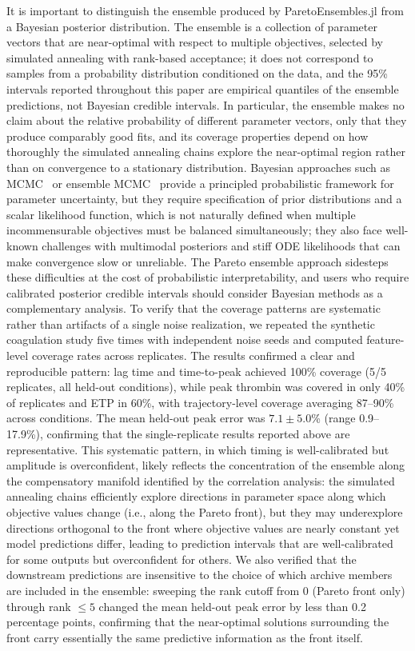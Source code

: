 \documentclass[preprint,review,12pt]{elsarticle}
\begin{document}
It is important to distinguish the ensemble produced by ParetoEnsembles.jl from a Bayesian posterior distribution.
The ensemble is a collection of parameter vectors that are near-optimal with respect to multiple objectives, selected by simulated annealing with rank-based acceptance; it does not correspond to samples from a probability distribution conditioned on the data, and the 95\% intervals reported throughout this paper are empirical quantiles of the ensemble predictions, not Bayesian credible intervals.
In particular, the ensemble makes no claim about the relative probability of different parameter vectors, only that they produce comparably good fits, and its coverage properties depend on how thoroughly the simulated annealing chains explore the near-optimal region rather than on convergence to a stationary distribution.
Bayesian approaches such as MCMC~\cite{Carpenter2017,Ge2018} or ensemble MCMC~\cite{ForemanMackey2013} provide a principled probabilistic framework for parameter uncertainty, but they require specification of prior distributions and a scalar likelihood function, which is not naturally defined when multiple incommensurable objectives must be balanced simultaneously; they also face well-known challenges with multimodal posteriors and stiff ODE likelihoods that can make convergence slow or unreliable.
The Pareto ensemble approach sidesteps these difficulties at the cost of probabilistic interpretability, and users who require calibrated posterior credible intervals should consider Bayesian methods as a complementary analysis.
To verify that the coverage patterns are systematic rather than artifacts of a single noise realization, we repeated the synthetic coagulation study five times with independent noise seeds and computed feature-level coverage rates across replicates.
The results confirmed a clear and reproducible pattern: lag time and time-to-peak achieved 100\% coverage (5/5 replicates, all held-out conditions), while peak thrombin was covered in only 40\% of replicates and ETP in 60\%, with trajectory-level coverage averaging 87--90\% across conditions.
The mean held-out peak error was $7.1 \pm 5.0$\% (range 0.9--17.9\%), confirming that the single-replicate results reported above are representative.
This systematic pattern, in which timing is well-calibrated but amplitude is overconfident, likely reflects the concentration of the ensemble along the compensatory manifold identified by the correlation analysis: the simulated annealing chains efficiently explore directions in parameter space along which objective values change (i.e., along the Pareto front), but they may underexplore directions orthogonal to the front where objective values are nearly constant yet model predictions differ, leading to prediction intervals that are well-calibrated for some outputs but overconfident for others.
We also verified that the downstream predictions are insensitive to the choice of which archive members are included in the ensemble: sweeping the rank cutoff from 0 (Pareto front only) through rank $\leq 5$ changed the mean held-out peak error by less than 0.2 percentage points, confirming that the near-optimal solutions surrounding the front carry essentially the same predictive information as the front itself.
\end{document}

